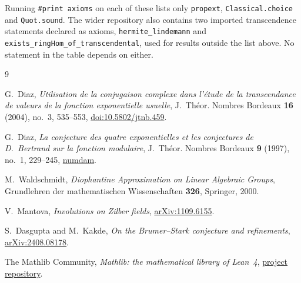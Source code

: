 \documentclass[11pt]{article}
\theoremstyle{definition}
\theoremstyle{remark}
\begin{document}
Running \verb|#print axioms| on each of these lists only \texttt{propext},
\texttt{Classical.choice} and \texttt{Quot.sound}. The wider repository also
contains two imported transcendence statements declared as axioms,
\texttt{hermite\_lindemann} and \texttt{exists\_ringHom\_of\_transcendental},
used for results outside the list above. No statement in the table depends on
either.

\begin{thebibliography}{9}

G.~Diaz,
\emph{Utilisation de la conjugaison complexe dans l'\'etude de la transcendance
de valeurs de la fonction exponentielle usuelle},
J.~Th\'eor. Nombres Bordeaux \textbf{16} (2004), no.~3, 535--553,
\href{https://doi.org/10.5802/jtnb.459}{doi:10.5802/jtnb.459}.

G.~Diaz,
\emph{La conjecture des quatre exponentielles et les conjectures de D.~Bertrand
sur la fonction modulaire},
J.~Th\'eor. Nombres Bordeaux \textbf{9} (1997), no.~1, 229--245,
\href{http://www.numdam.org/item/JTNB_1997__9_1_229_0/}{numdam}.

M.~Waldschmidt,
\emph{Diophantine Approximation on Linear Algebraic Groups},
Grundlehren der mathematischen Wissenschaften \textbf{326}, Springer, 2000.

V.~Mantova,
\emph{Involutions on Zilber fields},
\href{https://arxiv.org/abs/1109.6155}{arXiv:1109.6155}.

S.~Dasgupta and M.~Kakde,
\emph{On the Brumer--Stark conjecture and refinements},
\href{https://arxiv.org/abs/2408.08178}{arXiv:2408.08178}.

The Mathlib Community,
\emph{Mathlib: the mathematical library of Lean~4},
\href{https://github.com/leanprover-community/mathlib4}{project repository}.

\end{thebibliography}
\end{document}
